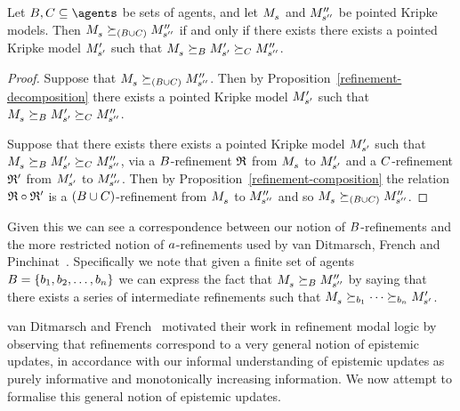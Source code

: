 \begin{proposition}
Let $\agentsB, \agentsC \subseteq \agents$ be sets of agents, and let $\kPModel{\kStateS}$ and ${M^{\prime\prime}_{{s}^{\prime\prime}}}$ be pointed Kripke models.
Then $\kPModel{\kStateS} \simulates[(\agentsB \cup \agentsC)] \kPModelPP{\kStateSPP}$ if and only if there exists there exists a pointed Kripke model ${M^{\prime}_{{s}^{\prime}}}$ such that $\kPModel{\kStateS} \simulatesBs \kPModelP{\kStateSP} \simulatesCs \kPModelPP{\kStateSPP}$.
\end{proposition}

\begin{proof}
Suppose that $\kPModel{\kStateS} \simulates[(\agentsB \cup \agentsC)] \kPModelPP{\kStateSPP}$.
Then by Proposition~\ref{refinement-decomposition} there exists a pointed Kripke model ${M^{\prime}_{{s}^{\prime}}}$ such that $\kPModel{\kStateS} \simulatesBs \kPModelP{\kStateSP} \simulatesCs \kPModelPP{\kStateSPP}$.

Suppose that there exists there exists a pointed Kripke model ${M^{\prime}_{{s}^{\prime}}}$ such that $\kPModel{\kStateS} \simulatesBs \kPModelP{\kStateSP} \simulatesCs \kPModelPP{\kStateSPP}$, via a $B$-refinement $\mathfrak{R}$ from $\kPModel{\kStateS}$ to ${M^{\prime}_{{s}^{\prime}}}$ and a $C$-refinement $\mathfrak{R}'$ from ${M^{\prime}_{{s}^{\prime}}}$ to ${M^{\prime\prime}_{{s}^{\prime\prime}}}$.
Then by Proposition~\ref{refinement-composition} the relation $\mathfrak{R} \circ \mathfrak{R}'$ is a $(B \cup C)$-refinement from $\kPModel{\kStateS}$ to ${M^{\prime\prime}_{{s}^{\prime\prime}}}$ and so $\kPModel{\kStateS} \simulates[(\agentsB \cup \agentsC)] \kPModelPP{\kStateSPP}$.
\end{proof}

Given this we can see a correspondence between our notion of $B$-refinements and the more restricted notion of $a$-refinements used by van Ditmarsch, French and Pinchinat~\cite{vanditmarsch:2010}.
Specifically we note that given a finite set of agents $B = \{b_1, b_2, \dots, b_n\}$ we can express the fact that $\kPModel{\kStateS} \simulatesBs \kPModelPP{\kStateSPP}$ by saying that there exists a series of intermediate refinements such that $\kPModel{\kStateS} \simulates[\agentB_1] \cdots \simulates[\agentB_n] \kPModelP{\kStateSP}$.

van Ditmarsch and French~\cite{vanditmarsch:2009} motivated their work in refinement modal logic by observing that refinements correspond to a very general notion of epistemic updates, in accordance with our informal understanding of epistemic updates as purely informative and monotonically increasing information.
We now attempt to formalise this general notion of epistemic updates.

